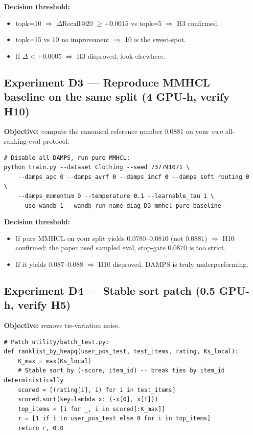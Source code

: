 \documentclass[11pt,a4paper]{article}
\begin{document}
\textbf{Decision threshold:}
\begin{itemize}[leftmargin=*]
    \item topk=10 $\Rightarrow$ $\Delta$Recall@20 $\geq +0.0015$ vs topk=5 $\Rightarrow$ H3 confirmed.
    \item topk=15 vs 10 no improvement $\Rightarrow$ 10 is the sweet-spot.
    \item If $\Delta < +0.0005$ $\Rightarrow$ H3 disproved, look elsewhere.
\end{itemize}

\subsection*{Experiment D3 --- Reproduce MMHCL baseline on the same split (4 GPU-h, verify H10)}

\textbf{Objective:} compute the canonical reference number 0.0881 on your
\emph{own} all-ranking eval protocol.

\begin{lstlisting}[style=bashstyle]
# Disable all DAMPS, run pure MMHCL:
python train.py --dataset Clothing --seed 737791071 \
    --damps_apc 0 --damps_avrf 0 --damps_imcf 0 --damps_soft_routing 0 \
    --damps_momentum 0 --temperature 0.1 --learnable_tau 1 \
    --use_wandb 1 --wandb_run_name diag_D3_mmhcl_pure_baseline
\end{lstlisting}

\textbf{Decision threshold:}
\begin{itemize}[leftmargin=*]
    \item If pure MMHCL on your split yields $0.0780$--$0.0810$ (not $0.0881$) $\Rightarrow$ H10 confirmed: the paper used sampled eval, stop-gate $0.0870$ is too strict.
    \item If it yields $0.087$--$0.088$ $\Rightarrow$ H10 disproved, DAMPS is truly underperforming.
\end{itemize}

\subsection*{Experiment D4 --- Stable sort patch (0.5 GPU-h, verify H5)}

\textbf{Objective:} remove tie-variation noise.

\begin{lstlisting}[style=pystyle]
# Patch utility/batch_test.py:
def ranklist_by_heapq(user_pos_test, test_items, rating, Ks_local):
    K_max = max(Ks_local)
    # Stable sort by (-score, item_id) -- break ties by item_id deterministically
    scored = [(rating[i], i) for i in test_items]
    scored.sort(key=lambda x: (-x[0], x[1]))
    top_items = [i for _, i in scored[:K_max]]
    r = [1 if i in user_pos_test else 0 for i in top_items]
    return r, 0.0
\end{lstlisting}
\end{document}
